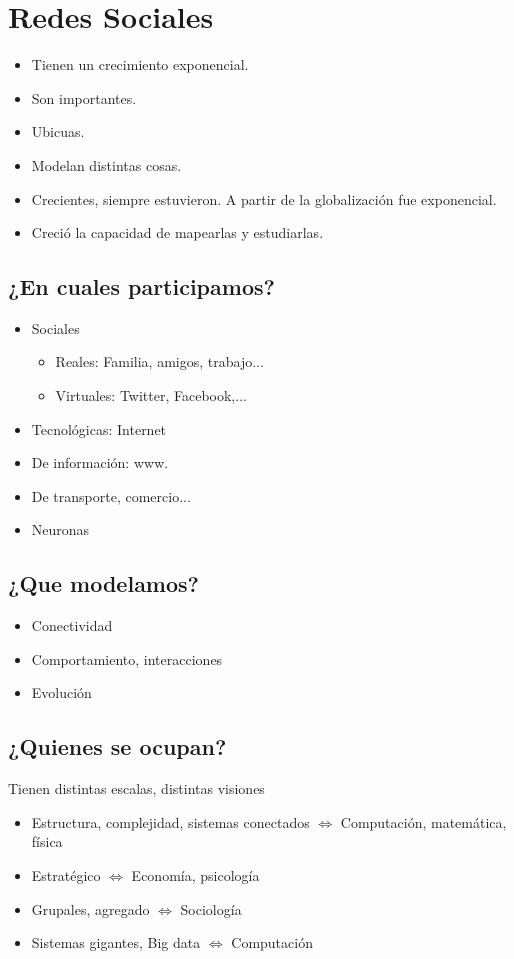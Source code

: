 \documentclass[titlepage,a4paper]{article}
\begin{document}
\section{Redes Sociales}
\begin{itemize}
    \item Tienen un crecimiento exponencial.
    \item Son importantes.
    \item Ubicuas.
    \item Modelan distintas cosas.
    \item Crecientes, siempre estuvieron. A partir de la globalización fue exponencial.
    \item Creció la capacidad de mapearlas y estudiarlas.
\end{itemize}

\subsection{¿En cuales participamos?}
\begin{itemize}
    \item Sociales
    \begin{itemize}
        \item Reales: Familia, amigos, trabajo...
        \item Virtuales: Twitter, Facebook,...
    \end{itemize}
    \item Tecnológicas: Internet
    \item De información: www.
    \item De transporte, comercio...
    \item Neuronas
\end{itemize}

\subsection{¿Que modelamos?}
\begin{itemize}
    \item Conectividad
    \item Comportamiento, interacciones
    \item Evolución
\end{itemize}

\subsection{¿Quienes se ocupan?}
Tienen distintas escalas, distintas visiones
\begin{itemize}
    \item Estructura, complejidad, sistemas conectados $\Longleftrightarrow$ Computación, matemática, física
    \item Estratégico $\Longleftrightarrow$ Economía, psicología
    \item Grupales, agregado $\Longleftrightarrow$ Sociología
    \item Sistemas gigantes, Big data $\Longleftrightarrow$ Computación
\end{itemize}
\end{document}
